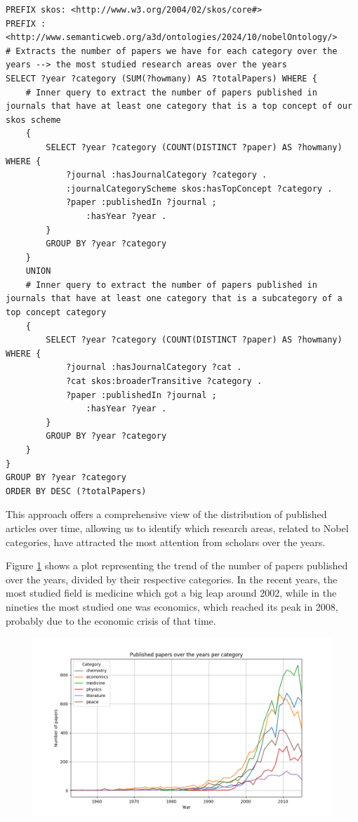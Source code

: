 \documentclass{article}
\begin{document}
\begin{lstlisting}
PREFIX skos: <http://www.w3.org/2004/02/skos/core#>
PREFIX : <http://www.semanticweb.org/a3d/ontologies/2024/10/nobelOntology/>
# Extracts the number of papers we have for each category over the years --> the most studied research areas over the years
SELECT ?year ?category (SUM(?howmany) AS ?totalPapers) WHERE {
    # Inner query to extract the number of papers published in journals that have at least one category that is a top concept of our skos scheme
    {
        SELECT ?year ?category (COUNT(DISTINCT ?paper) AS ?howmany) WHERE {
            ?journal :hasJournalCategory ?category .
            :journalCategoryScheme skos:hasTopConcept ?category .
            ?paper :publishedIn ?journal ;
                :hasYear ?year .
        }
        GROUP BY ?year ?category
    }
    UNION
    # Inner query to extract the number of papers published in journals that have at least one category that is a subcategory of a top concept category
    {
        SELECT ?year ?category (COUNT(DISTINCT ?paper) AS ?howmany) WHERE {
            ?journal :hasJournalCategory ?cat .
            ?cat skos:broaderTransitive ?category .
            ?paper :publishedIn ?journal ;
                :hasYear ?year .
        }
        GROUP BY ?year ?category
    }
}
GROUP BY ?year ?category
ORDER BY DESC (?totalPapers)
\end{lstlisting}

\newpage

\noindent This approach offers a comprehensive view of the distribution of published articles over time, allowing us to identify which research areas, related
to Nobel categories, have attracted the most attention from scholars over the years.

\noindent Figure \ref{fig:papersPerCategory} shows a plot representing the trend of the number of papers published over the years, divided by their respective categories.
In the recent years, the most studied field is medicine which got a big leap around 2002, while in the nineties the most studied one was economics, which
reached its peak in 2008, probably due to the economic crisis of that time.
\begin{figure}[ht]
	\label{fig:papersPerCategory}
	\centering
	\includegraphics[width=\textwidth]{../queries/plots/papersPerCategory.png}
\end{figure}
\end{document}

